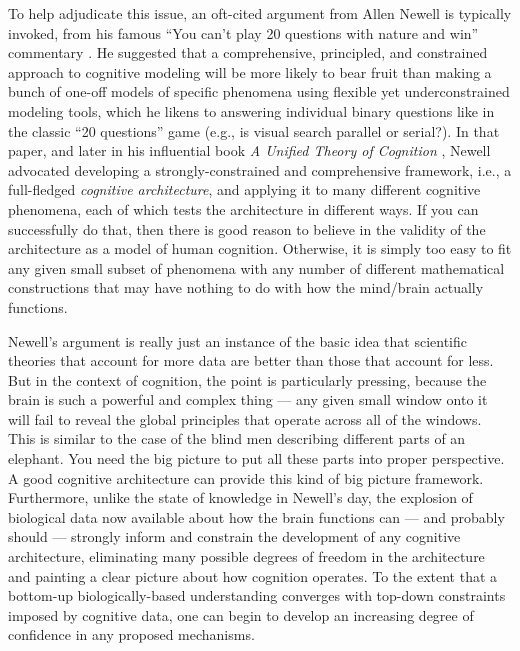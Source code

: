 \documentclass[11pt,twoside]{article}
\begin{document}
To help adjudicate this issue, an oft-cited argument from Allen Newell
is typically invoked, from his famous ``You can't play 20 questions
with nature and win'' commentary \cite{Newell73}.  He suggested that a
comprehensive, principled, and constrained approach to cognitive
modeling will be more likely to bear fruit than making a bunch of
one-off models of specific phenomena using flexible yet
underconstrained modeling tools, which he likens to answering
individual binary questions like in the classic ``20 questions'' game
(e.g., is visual search parallel or serial?).  In that paper, and
later in his influential book {\em A Unified Theory of Cognition}
, Newell advocated developing a strongly-constrained
and comprehensive framework, i.e., a full-fledged {\em cognitive
  architecture}, and applying it to many different cognitive
phenomena, each of which tests the architecture in different ways.  If
you can successfully do that, then there is good reason to believe in
the validity of the architecture as a model of human cognition.
Otherwise, it is simply too easy to fit any given small subset of
phenomena with any number of different mathematical constructions that
may have nothing to do with how the mind/brain actually functions.

Newell's argument is really just an instance of the basic idea that
scientific theories that account for more data are better than those
that account for less.  But in the context of cognition, the point is
particularly pressing, because the brain is such a powerful and
complex thing --- any given small window onto it will fail to reveal
the global principles that operate across all of the windows.  This is
similar to the case of the blind men describing different parts of an
elephant.  You need the big picture to put all these parts into proper
perspective.  A good cognitive architecture can provide this kind of
big picture framework.  Furthermore, unlike the state of knowledge in
Newell's day, the explosion of biological data now available about how
the brain functions can --- and probably should --- strongly inform
and constrain the development of any cognitive architecture,
eliminating many possible degrees of freedom in the architecture and
painting a clear picture about how cognition operates.  To the extent
that a bottom-up biologically-based understanding converges with
top-down constraints imposed by cognitive data, one can begin to
develop an increasing degree of confidence in any proposed mechanisms.
\end{document}
